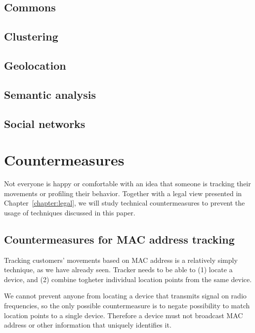 \documentclass[12pt,a4paper,oneside,pdftex]{report}
\begin{document}
\section{Commons}
\label{sec:practical_commons}

\section{Clustering}
\label{sec:practical_clustering}

\section{Geolocation}
\label{sec:practical_geo}

\section{Semantic analysis}
\label{sec:practical_semantic}

\section{Social networks}
\label{sec:practical_social}





\chapter{Countermeasures}
\label{chapter:countermeasures}

Not everyone is happy or comfortable with an idea that someone is tracking their movements or profiling their behavior. Together with a legal view presented in Chapter~\ref{chapter:legal}, we will study technical countermeasures to prevent the usage of techniques discussed in this paper. 

\section{Countermeasures for MAC address tracking}

Tracking customers' movements based on MAC address is a relatively simply technique, as we have already seen. Tracker needs to be able to (1) locate a device, and (2) combine togheter individual location points from the same device.

We cannot prevent anyone from locating a device that transmits signal on radio frequencies, so the only possible countermeasure is to negate possibility to match location points to a single device. Therefore a device must not broadcast MAC address or other information that uniquely identifies it.
\end{document}
